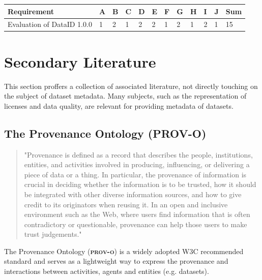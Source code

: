 \documentclass[a4paper,english,twoside,BCOR1.5cm,headsepline,DIV12,appendixprefix,final,12pt]{scrbook}
\newcommand{\prov}{{\scshape\bfseries prov-o}\xspace}
\begin{document}
\begin{table}[!htbp]
    \centering
    \begin{tabular}{|l|l|l|l|l|l|l|l|l|l|l|l|}
        \hline
        Requirement & A & B & C & D & E & F & G & H & I & J & Sum \\
        \hline
        Evaluation of DataID 1.0.0 & 1 & 2 & 1 & 2 & 2 & 1 & 2 & 1 & 2 & 1 & 15 \\
        \hline
    \end{tabular}
    \label{tab:evaldataid100}
\end{table}

\pagebreak
\section{Secondary Literature}
\label{sec:auxiliary}

This section proffers a collection of associated literature, not directly touching on the subject of dataset metadata. Many subjects, such as the representation of licenses and data quality, are relevant for providing metadata of datasets.

\subsection{The Provenance Ontology (PROV-O)}
\label{sec:prov}

\begin{quote}
"Provenance is defined as a record that describes the people, institutions, entities, and activities involved in producing, influencing, or delivering a piece of data or a thing. In particular, the provenance of information is crucial in deciding whether the information is to be trusted, how it should be integrated with other diverse information sources, and how to give credit to its originators when reusing it. In an open and inclusive environment such as the Web, where users find information that is often contradictory or questionable, provenance can help those users to make trust judgements." \cite{MoreauProvDM2013}
\end{quote}


The Provenance Ontology\cite{prov} (\prov) is a widely adopted W3C recommended standard and serves as a lightweight way to express the provenance and interactions between activities, agents and entities (e.g. datasets). 
\end{document}
